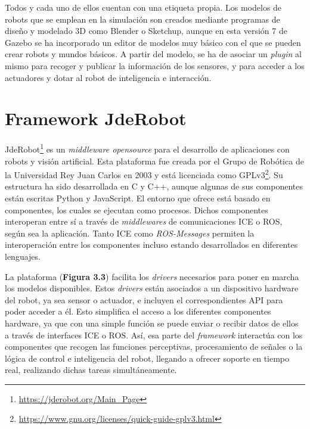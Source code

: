 Todos y cada uno de ellos cuentan con una etiqueta propia. Los modelos de robots que se emplean en la simulación son creados mediante programas de diseño y modelado 3D como Blender o Sketchup, aunque en esta versión 7 de Gazebo se ha incorporado un editor de modelos muy básico con el que se pueden crear robots y mundos básicos. A partir del modelo, se ha de asociar un \textit{plugin} al mismo para recoger y publicar la información de los sensores, y para acceder a los actuadores y dotar al robot de inteligencia e interacción.

\section{Framework JdeRobot}
JdeRobot\footnote{\url{https://jderobot.org/Main_Page}} es un \textit{middleware opensource} para el desarrollo de aplicaciones con robots y visión artificial. Esta plataforma fue creada por el Grupo de Robótica de la Universidad Rey Juan Carlos en 2003 y está licenciada como GPLv3\footnote{\url{https://www.gnu.org/licenses/quick-guide-gplv3.html}}.
Su estructura ha sido desarrollada en C y C++, aunque algunas de sus componentes están escritas Python y JavaScript. El entorno que ofrece está basado en componentes, los cuales se ejecutan como procesos. Dichos componentes interoperan entre sí a través de \textit{middlewares} de comunicaciones ICE o  ROS, según sea la aplicación. Tanto ICE como \textit{ROS-Messages} permiten la interoperación entre los componentes incluso estando desarrollados en diferentes lenguajes.

La plataforma (\textbf{Figura 3.3}) facilita los \textit{drivers} necesarios para poner en marcha los modelos disponibles. Estos \textit{drivers} están asociados a un dispositivo hardware del robot, ya sea sensor o actuador, e incluyen el correspondientes API para poder acceder a él. Esto simplifica el acceso a los diferentes componentes hardware, ya que con una simple función se puede enviar o recibir datos de ellos a través de interfaces ICE o ROS.
Así, esa parte del \textit{framework} interactúa con los componentes que recogen las funciones perceptivas, procesamiento de señales o la lógica de control e inteligencia del robot, llegando a ofrecer soporte en tiempo real, realizando dichas tareas simultáneamente. 

